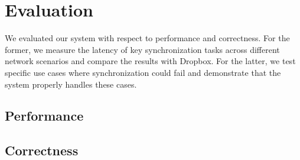 \section{Evaluation}
\label{evaluation}
We evaluated our system with respect to performance and correctness.
For the former, we measure the latency of key synchronization tasks
across different network scenarios and compare the results
with Dropbox. For the latter, we test specific use cases
where synchronization could fail and demonstrate that the system
properly handles these cases.

\subsection{Performance}
\label{evaluation.performance}


\subsection{Correctness}
\label{evaluation.correctness}
